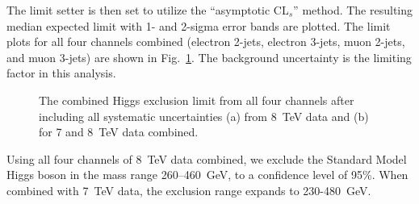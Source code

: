 The limit setter is then set to utilize
the ``asymptotic CL$_{s}$''
\cite{cite:asympcls1,cite:asympcls2} method. 
The resulting median
expected limit with 1- and 2-sigma error bands are plotted.
The limit plots for all four channels combined (electron 2-jets, 
electron 3-jets, muon 2-jets, and muon 3-jets) are shown in
Fig.~\ref{fig:limitsetup:combinedlimit}. 
The background uncertainty is the limiting factor in this analysis.
\begin{figure}[htb] 
  \begin{center}
    \caption{The combined Higgs exclusion limit from all four channels
      after including all systematic uncertainties  (a) from 8~TeV data and (b) for 7 and 8~TeV data combined.}
    \label{fig:limitsetup:combinedlimit}
  \end{center}
\end{figure}

Using all four channels of 8~TeV data combined, we exclude the Standard Model 
Higgs boson in the mass range 260--460~GeV, to a confidence level
of 95\%.  When combined with 7~TeV data, the exclusion range expands to 230-480~GeV.
